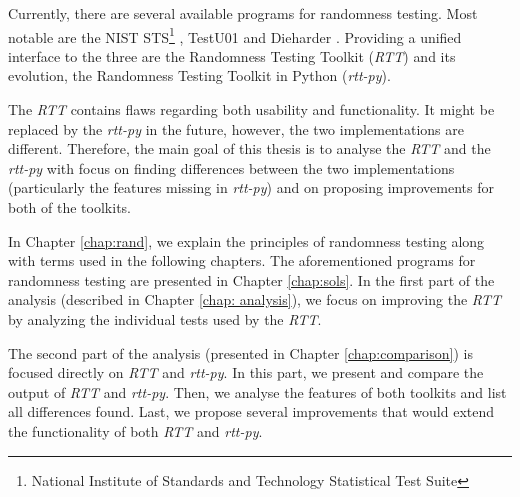 \documentclass[
  digital,     %
  oneside,     %
  nosansbold,  %
  nocolorbold, %
  nolof,         %
  nolot,         %
]{fithesis4}
\begin{document}

Currently, there are several available programs for randomness testing. Most notable are the NIST STS\footnote{National Institute of Standards and Technology Statistical Test Suite} \cite{nist_special}, TestU01 \cite{tu01_guide} and Dieharder \cite{dieharder_orig}. Providing a unified interface to the three are the Randomness Testing Toolkit (\emph{RTT}) \cite{rtt-obratil} and its evolution, the Randomness Testing Toolkit in Python (\emph{rtt-py})\cite{vavercak}.




The \emph{RTT} contains flaws regarding both usability and functionality. It might be replaced by the \emph{rtt-py} in the future, however, the two implementations are different. Therefore, the main goal of this thesis is to analyse the \emph{RTT} and the \emph{rtt-py} with focus on finding differences between the two implementations (particularly the features missing in \emph{rtt-py}) and on proposing improvements for both of the toolkits. 

In Chapter \ref{chap:rand}, we explain the principles of randomness testing along with terms used in the following chapters. The aforementioned programs for randomness testing are presented in Chapter \ref{chap:sols}. In the first part of the analysis (described in Chapter \ref{chap: analysis}), we focus on improving the \emph{RTT} by analyzing the individual tests used by the \emph{RTT}. %

The second part of the analysis (presented in Chapter \ref{chap:comparison}) is focused directly on \emph{RTT} and \emph{rtt-py}. In this part, we present and compare the output of \emph{RTT} and \emph{rtt-py}. Then, we analyse the features of both toolkits and list all differences found. Last, we propose several improvements that would extend the functionality of both \emph{RTT} and \emph{rtt-py}.
\end{document}
